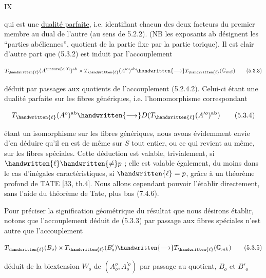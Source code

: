 \hfill IX

qui est une \uline{dualité parfaite}, i.e. identifiant chacun des deux facteurs du premier membre au dual de l'autre (au sens de 5.2.2). (NB les exposants ab désignent les ``parties abéliennes'', quotient de la partie fixe par la partie torique). Il est clair d'autre part que (5.3.2) est induit par l'accouplement

\[
T_{\handwritten{\ell}}(A^{\unsure{o|0}})^{\mathrm{ab}}\times T_{\handwritten{\ell}}(A^{\prime o})^{\mathrm{ab}}\handwritten{\longrightarrow} T_{\handwritten{\ell}}(\mathbb{G}_{mS})\tag*{(5.3.3)}
\]

déduit par passages aux quotients de l'accouplement (5.2.4.2). Celui-ci étant une dualité parfaite sur les fibres génériques, i.e. l'homomorphisme correspondant

\[
T_{\handwritten{\ell}}(A^o)^{\mathrm{ab}}\handwritten{\longrightarrow} D(T_{\handwritten{\ell}}(A^{\prime o})^{\mathrm{ab}})\tag*{(5.3.4)}
\]

étant un isomorphisme sur les fibres génériques, nous avons évidemment envie d'en déduire qu'il en est de même sur $S$ tout entier, ou ce qui revient au même, sur les fibres spéciales. Cette déduction est valable, trivialement, si $\handwritten{\ell}\handwritten{\ne}p$ ; elle est valable également, du moins dans le cas d'inégales caractéristiques, si $\handwritten{\ell}=p$, grâce à un théorème profond de TATE [33, th.4]. Nous allons cependant pouvoir l'établir directement, sans l'aide du théorème de Tate, plus bas (7.4.6).

Pour préciser la signification géométrique du résultat que nous désirons établir, notons que l'accouplement déduit de (5.3.3) par passage aux fibres spéciales n'est autre que l'accouplement

\[
T_{\handwritten{\ell}}(B_o)\times T_{\handwritten{\ell}}(B'_o)\handwritten{\longrightarrow} T_{\handwritten{\ell}}(\mathbb{G}_{mk})\tag*{(5.3.5)}
\]

déduit de la biextension $W_o$ de $(A_o^o,A^{\prime o}_o)$ par passage au quotient, $B_o$ et $B'_o$

